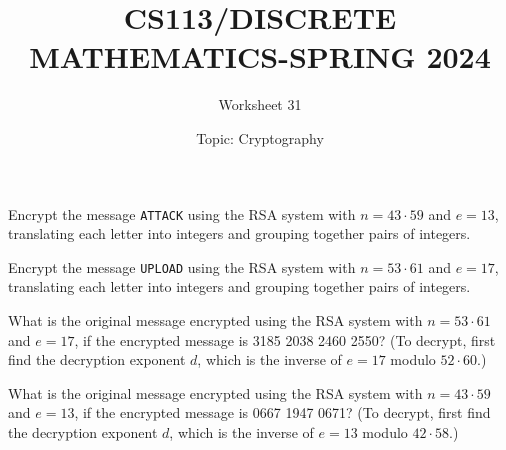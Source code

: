 \documentclass{exam}
\title{CS113/DISCRETE MATHEMATICS-SPRING 2024}
\author{Worksheet 31}
\date{Topic: Cryptography }
\begin{document}
\maketitle
\vspace{5mm}
\begin{center}
\end{center}
\vspace{5mm}


\vspace{5mm}

\vspace{5mm}




\begin{questions}

\question
Encrypt the message \texttt{ATTACK} using the RSA system with $n = 43 \cdot 59$ and $e = 13$, translating each letter into integers and grouping together pairs of integers.

\newpage



\question Encrypt the message \texttt{UPLOAD} using the RSA system with $n = 53 \cdot 61$ and $e = 17$, translating each letter into integers and grouping together pairs of integers.

\newpage


\question
What is the original message encrypted using the RSA system with $n = 53 \cdot 61$ and $e = 17$, if the encrypted message is 3185 2038 2460 2550? (To decrypt, first find the decryption exponent $d$, which is the inverse of $e = 17$ modulo $52 \cdot 60$.)


\newpage

\question
What is the original message encrypted using the RSA system with $n = 43 \cdot 59$ and $e = 13$, if the encrypted message is 0667 1947 0671? (To decrypt, first find the decryption exponent $d$, which is the inverse of $e = 13$ modulo $42 \cdot 58$.)
\newpage

\end{questions}
\end{document}
